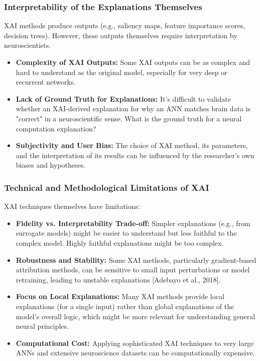 \documentclass[11pt,a4paper]{article}
\begin{document}
\subsubsection{Interpretability of the Explanations Themselves}
XAI methods produce outputs (e.g., saliency maps, feature importance scores, decision trees). However, these outputs themselves require interpretation by neuroscientists.
\begin{itemize}
    \item \textbf{Complexity of XAI Outputs:} Some XAI outputs can be as complex and hard to understand as the original model, especially for very deep or recurrent networks.
    \item \textbf{Lack of Ground Truth for Explanations:} It's difficult to validate whether an XAI-derived explanation for why an ANN matches brain data is "correct" in a neuroscientific sense. What is the ground truth for a neural computation explanation?
    \item \textbf{Subjectivity and User Bias:} The choice of XAI method, its parameters, and the interpretation of its results can be influenced by the researcher's own biases and hypotheses.
\end{itemize}

\subsubsection{Technical and Methodological Limitations of XAI}
XAI techniques themselves have limitations:
\begin{itemize}
    \item \textbf{Fidelity vs. Interpretability Trade-off:} Simpler explanations (e.g., from surrogate models) might be easier to understand but less faithful to the complex model. Highly faithful explanations might be too complex.
    \item \textbf{Robustness and Stability:} Some XAI methods, particularly gradient-based attribution methods, can be sensitive to small input perturbations or model retraining, leading to unstable explanations [Adebayo et al., 2018].
    \item \textbf{Focus on Local Explanations:} Many XAI methods provide local explanations (for a single input) rather than global explanations of the model's overall logic, which might be more relevant for understanding general neural principles.
    \item \textbf{Computational Cost:} Applying sophisticated XAI techniques to very large ANNs and extensive neuroscience datasets can be computationally expensive.
\end{itemize}
\end{document}
